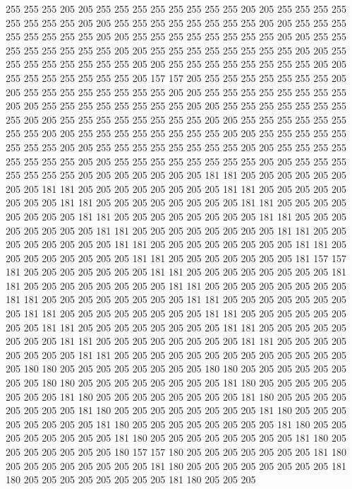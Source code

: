 255 255 255 205 205 255 255 255 255 255 255 255 255 205 205 255 255 255 255 255
255 255 255 205 205 255 255 255 255 255 255 255 255 205 205 255 255 255 255 255
255 255 255 205 205 255 255 255 255 255 255 255 255 205 205 255 255 255 255 255
255 255 255 205 205 255 255 255 255 255 255 255 255 205 205 255 255 255 255 255
255 255 255 205 205 255 255 255 255 255 255 255 255 205 205 255 255 255 255 255
255 255 205 157 157 205 255 255 255 255 255 255 255 205 205 255 255 255 255 255
255 255 255 205 205 255 255 255 255 255 255 255 255 205 205 255 255 255 255 255
255 255 255 205 205 255 255 255 255 255 255 255 255 205 205 255 255 255 255 255
255 255 255 205 205 255 255 255 255 255 255 255 255 205 205 255 255 255 255 255
255 255 255 205 205 255 255 255 255 255 255 255 255 205 205 255 255 255 255 255
255 255 255 205 205 255 255 255 255 255 255 255 255 205 205 255 255 255 255 255
255 255 255 205 205 255 255 255 255 255 255 255 205 205 205 205 205 205 205 181
181 205 205 205 205 205 205 205 205 181 181 205 205 205 205 205 205 205 205 181
181 205 205 205 205 205 205 205 205 181 181 205 205 205 205 205 205 205 205 181
181 205 205 205 205 205 205 205 205 181 181 205 205 205 205 205 205 205 205 181
181 205 205 205 205 205 205 205 205 181 181 205 205 205 205 205 205 205 205 181
181 205 205 205 205 205 205 205 205 181 181 205 205 205 205 205 205 205 205 181
181 205 205 205 205 205 205 205 205 181 181 205 205 205 205 205 205 205 181 157
157 181 205 205 205 205 205 205 205 181 181 205 205 205 205 205 205 205 205 181
181 205 205 205 205 205 205 205 205 181 181 205 205 205 205 205 205 205 205 181
181 205 205 205 205 205 205 205 205 181 181 205 205 205 205 205 205 205 205 181
181 205 205 205 205 205 205 205 205 181 181 205 205 205 205 205 205 205 205 181
181 205 205 205 205 205 205 205 205 181 181 205 205 205 205 205 205 205 205 181
181 205 205 205 205 205 205 205 205 181 181 205 205 205 205 205 205 205 205 181
181 205 205 205 205 205 205 205 205 205 205 205 205 205 205 180 180 205 205 205
205 205 205 205 205 180 180 205 205 205 205 205 205 205 205 180 180 205 205 205
205 205 205 205 205 181 180 205 205 205 205 205 205 205 205 181 180 205 205 205
205 205 205 205 205 181 180 205 205 205 205 205 205 205 205 181 180 205 205 205
205 205 205 205 205 181 180 205 205 205 205 205 205 205 205 181 180 205 205 205
205 205 205 205 205 181 180 205 205 205 205 205 205 205 205 181 180 205 205 205
205 205 205 205 205 181 180 205 205 205 205 205 205 205 180 157 157 180 205 205
205 205 205 205 205 181 180 205 205 205 205 205 205 205 205 181 180 205 205 205
205 205 205 205 205 181 180 205 205 205 205 205 205 205 205 181 180 205 205 205
